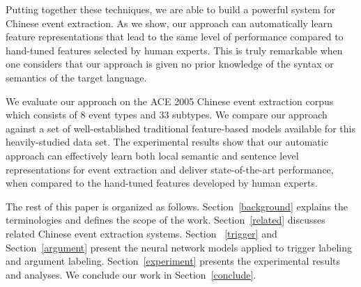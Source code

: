 Putting together these techniques, we are able to build a powerful
system for Chinese event extraction. As we show, our approach can
automatically learn feature representations that lead to the same level of performance compared to hand-tuned features selected by %
human experts. This is truly remarkable when one considers that our approach is given no prior knowledge of
the syntax or semantics of the target language. %

We evaluate our approach on the ACE 2005 Chinese event extraction corpus which consists of 8 event types and 33 subtypes.
We compare our approach against a set of well-established traditional feature-based models available for this heavily-studied data set.
The experimental results show that our automatic approach can effectively learn both local semantic and sentence level
representations for event extraction and deliver state-of-the-art performance, when compared to
the hand-tuned features developed by human experts.


The rest of this paper is organized as follows. Section~\ref{background} explains the terminologies and defines the
scope of the work. Section~\ref{related} discusses related Chinese event extraction systems. Section ~\ref{trigger} and
Section~\ref{argument} present the neural network models applied to trigger labeling and argument labeling.
Section~\ref{experiment} presents the experimental results and analyses. We conclude our work in
Section~\ref{conclude}.
